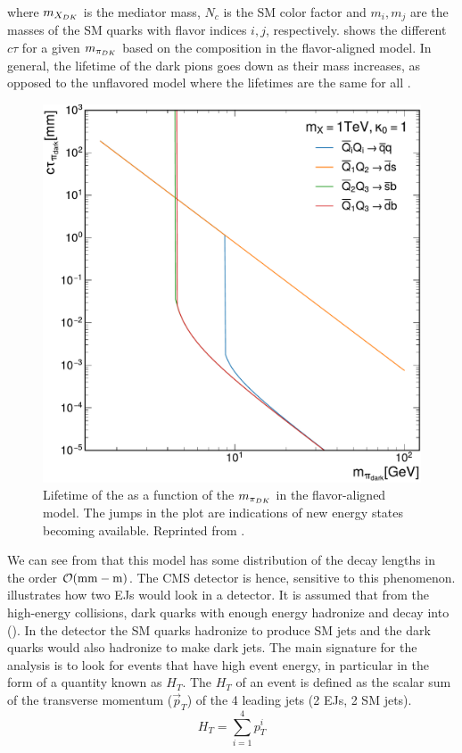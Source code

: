 where $m_{X_{DK}}$ is the mediator mass, $N_c$ is the SM color factor and $m_i, m_j$ are the masses of the SM quarks with flavor indices $i, j$, respectively\cite{CMS:2024gxp}.
 shows the different $c\tau$ for a given $m_{\pi_{DK}}$ based on the \pidark composition in the flavor-aligned model. In general, the lifetime of the dark pions goes down as their mass increases, as opposed to the unflavored model where the lifetimes are the same for all \pidark.
\begin{figure}[h]
	\centering
	\includegraphics[width=.65\linewidth]{Images/pdfs/FlavoredLifetime.pdf}
	\caption[Lifetimes of the dark pions as a function of their mass.]{Lifetime of the \pidark as a function of the $m_{\pi_{DK}}$ in the flavor-aligned model. The jumps in the plot are indications of new energy states becoming available. Reprinted from \cite{CMS:2024gxp}.}
	\label{fig:lifetimes}
\end{figure}

We can see from  that this model has some distribution of the decay lengths in the order $\order{\unit{mm} - \unit{m}}$. The CMS detector is hence, sensitive to this phenomenon.
 illustrates how two EJs would look in a detector. It is assumed that from the high-energy collisions, dark quarks with enough energy hadronize and decay into (\pidark). In the detector the SM quarks hadronize to produce SM jets and the dark quarks would also hadronize to make dark jets. The main signature for the analysis is to look for events that have high event energy, in particular in the form of a quantity known as $H_T$. The $H_T$ of an event is defined as the scalar sum of the transverse momentum ($\Vec{p}_T$) of the 4 leading jets (2 EJs, 2 SM jets).
\begin{equation}
	H_T = \sum_{i=1}^4 p_T^i
\end{equation}

